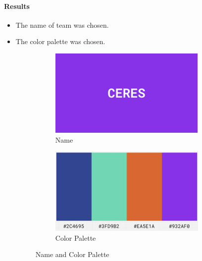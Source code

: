 \documentclass{article}
\begin{document}
\paragraph{Results}
\begin{itemize}
    \item The name of team was chosen. 
    \item The color palette was chosen. 
    \begin{figure}[H]
        \centering
        \begin{subfigure}{.5\textwidth}
          \centering
          \includegraphics[width=.8\linewidth]{Images/Design/Name.png}
          \caption{Name}
          
        \end{subfigure}%
        \begin{subfigure}{.5\textwidth}
          \centering
          \includegraphics[width=.8\linewidth]{Images/Design/PaletteV1.png}
          \caption{Color Palette}
          
        \end{subfigure}
        \caption{Name and Color Palette}
        

\end{figure}
\end{itemize}
\end{document}

